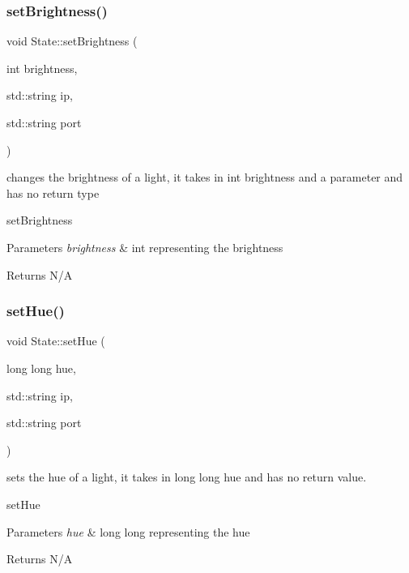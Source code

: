 \subsubsection{\texorpdfstring{set\+Brightness()}{setBrightness()}}
{\footnotesize\ttfamily void State\+::set\+Brightness (\begin{DoxyParamCaption}\item[{int}]{brightness,  }\item[{std\+::string}]{ip,  }\item[{std\+::string}]{port }\end{DoxyParamCaption})}



changes the brightness of a light, it takes in int brightness and a parameter and has no return type 

set\+Brightness 
\begin{DoxyParams}{Parameters}
{\em brightness} & int representing the brightness \\
\hline
\end{DoxyParams}
\begin{DoxyReturn}{Returns}
N/A 
\end{DoxyReturn}
\mbox{\label{class_state_a7fdaf261372291d6bbabfa9ed19fb44a}} 
\subsubsection{\texorpdfstring{set\+Hue()}{setHue()}}
{\footnotesize\ttfamily void State\+::set\+Hue (\begin{DoxyParamCaption}\item[{long long}]{hue,  }\item[{std\+::string}]{ip,  }\item[{std\+::string}]{port }\end{DoxyParamCaption})}



sets the hue of a light, it takes in long long hue and has no return value. 

set\+Hue 
\begin{DoxyParams}{Parameters}
{\em hue} & long long representing the hue \\
\hline
\end{DoxyParams}
\begin{DoxyReturn}{Returns}
N/A 
\end{DoxyReturn}
\mbox{\label{class_state_af2ff926d083755dc5c0efe8c115817b6}} 
